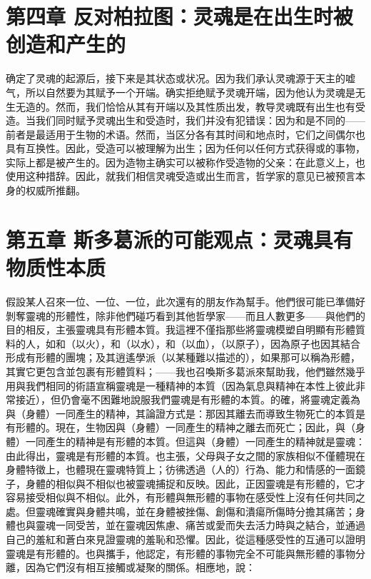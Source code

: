 
\section{第四章 反对柏拉图：灵魂是在出生时被创造和产生的}

确定了灵魂的起源后，接下来是其状态或状况。因为我们承认灵魂源于天主的嘘气，所以自然要为其赋予一个开端。确实拒绝赋予灵魂开端，因为他认为灵魂是无生无造的。然而，我们恰恰从其有开端以及其性质出发，教导灵魂既有出生也有受造。当我们同时赋予灵魂出生和受造时，我们并没有犯错误：因为和是不同的——前者是最适用于生物的术语。然而，当区分各有其时间和地点时，它们之间偶尔也具有互换性。因此，受造可以被理解为出生；因为任何以任何方式获得或的事物，实际上都是被产生的。因为造物主确实可以被称作受造物的父亲：在此意义上，也使用这种措辞。因此，就我们相信灵魂受造或出生而言，哲学家的意见已被预言本身的权威所推翻。\par


\section{第五章 斯多葛派的可能观点：灵魂具有物质性本质}

假設某人召來一位、一位、一位，此次還有的朋友作為幫手。他們很可能已準備好剝奪靈魂的形體性，除非他們碰巧看到其他哲學家——而且人數更多——與他們的目的相反，主張靈魂具有形體本質。我這裡不僅指那些將靈魂模塑自明顯有形體質料的人，如和（以火），和（以水），和（以血），（以原子），因為原子也因其結合形成有形體的團塊；及其逍遙學派（以某種難以描述的），如果那可以稱為形體，其實它更包含並包裹有形體質料；——我也召喚斯多葛派來幫助我，他們雖然幾乎用與我們相同的術語宣稱靈魂是一種精神的本質（因為氣息與精神在本性上彼此非常接近），但仍會毫不困難地說服我們靈魂是有形體的本質。的確，將靈魂定義為與（身體）一同產生的精神，其論證方式是：那因其離去而導致生物死亡的本質是有形體的。現在，生物因與（身體）一同產生的精神之離去而死亡；因此，與（身體）一同產生的精神是有形體的本質。但這與（身體）一同產生的精神就是靈魂：由此得出，靈魂是有形體的本質。也主張，父母與子女之間的家族相似不僅體現在身體特徵上，也體現在靈魂特質上；彷彿透過（人的）行為、能力和情感的一面鏡子，身體的相似與不相似也被靈魂捕捉和反映。因此，正因靈魂是有形體的，它才容易接受相似與不相似。此外，有形體與無形體的事物在感受性上沒有任何共同之處。但靈魂確實與身體共鳴，並在身體被挫傷、創傷和潰瘍所傷時分擔其痛苦；身體也與靈魂一同受苦，並在靈魂因焦慮、痛苦或愛而失去活力時與之結合，並通過自己的羞紅和蒼白來見證靈魂的羞恥和恐懼。因此，從這種感受性的互通可以證明靈魂是有形體的。也與攜手，他認定，有形體的事物完全不可能與無形體的事物分離，因為它們沒有相互接觸或凝聚的關係。相應地，說：\par

